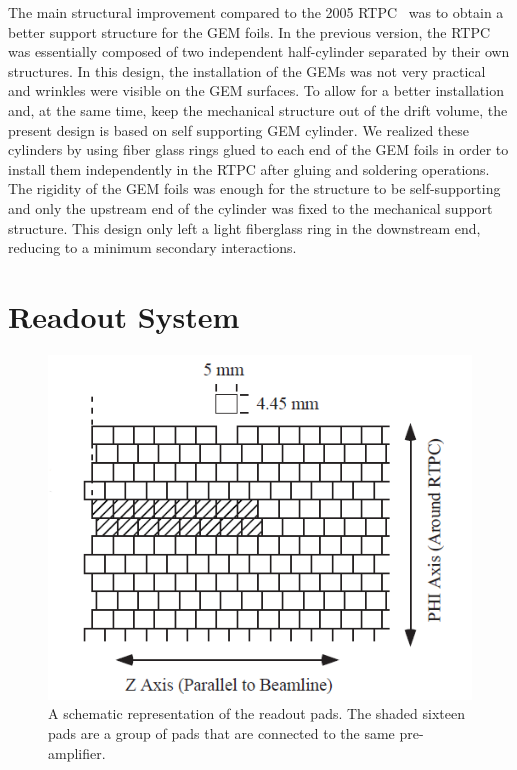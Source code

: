 \documentclass[preprint,5p]{elsarticle}
\begin{document}
The main structural improvement compared to the 2005 RTPC~\cite{Fenker:2008zz} 
was to obtain a better support structure for the GEM foils. In the previous version,
the RTPC was essentially composed of two independent half-cylinder separated
by their own structures. In this design, the installation of the GEMs was not 
very practical and wrinkles were visible on the GEM surfaces. To allow for a 
better installation and, at the same time, keep the mechanical structure out of 
the drift volume, the present design is based on self supporting GEM cylinder.  
We realized these cylinders by using fiber glass rings glued to each end of the 
GEM foils in order to install them independently in the RTPC after gluing and 
soldering operations. The rigidity of the GEM foils was enough for the 
structure to be self-supporting and only the upstream end of the cylinder was 
fixed to the mechanical support structure. This design only left a light 
fiberglass ring in the downstream end, reducing to a minimum secondary 
interactions.

\section{Readout System} \label{sec_readout}

\begin{figure}[tb]
   \centering
   \includegraphics[scale=0.55]{PADs.png}
   \caption[]{A schematic representation of the readout pads. The 
   shaded sixteen pads are a group of pads that are connected to the same 
pre-amplifier.} \label{fig:PADs}
\end{figure}
\end{document}
